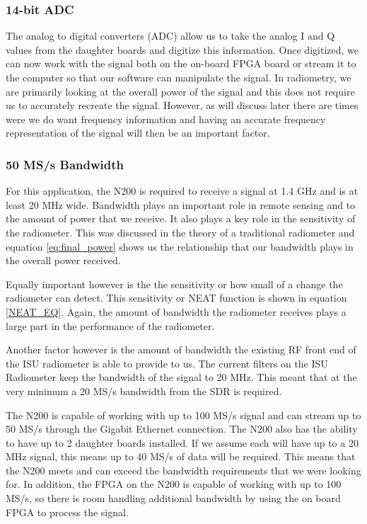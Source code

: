 \subsubsection{14-bit ADC}
The analog to digital converters (ADC) allow us to take the analog I and Q values from the daughter boards and digitize this information.  Once digitized, we can now work with the signal both on the on-board FPGA board or stream it to the computer so that our software can manipulate the signal.  In radiometry, we are primarily looking at the overall power of the signal and this does not require us to accurately recreate the signal.  However, as will discuss later there are times were we do want frequency information and having an accurate frequency representation of the signal will then be an important factor.

\subsubsection{50 MS/s Bandwidth}
For this application, the N200 is required to receive a signal at 1.4 GHz and is at least 20 MHz wide.  Bandwidth plays an important role in remote sensing and to the amount of power that we receive.  It also plays a key role in the sensitivity of the radiometer.  This was discussed in the theory of a traditional radiometer and equation \ref{eq:final_power} shows us the relationship that our bandwidth plays in the overall power received.    

Equally important however is the the sensitivity or how small of a change the radiometer can detect.  This sensitivity or NEAT function is shown in equation \ref{NEAT_EQ}.  Again, the amount of bandwidth the radiometer receives plays a large part in the performance of the radiometer.  

Another factor however is the amount of bandwidth the existing RF front end of the ISU radiometer is able to provide to us.  The current filters on the ISU Radiometer keep the bandwidth of the signal to 20 MHz.  This meant that at the very minimum a 20 MS/s bandwidth from the SDR is required.  

The N200 is capable of working with up to 100 MS/s signal and can stream up to 50 MS/s through the Gigabit Ethernet connection.  The N200 also has the ability to have up to 2 daughter boards installed.  If we assume each will have up to a 20 MHz signal, this means up to 40 MS/s of data will be required.  This means that the N200 meets and can exceed the bandwidth requirements that we were looking for.  In addition, the FPGA on the N200 is capable of working with up to 100 MS/s, so there is room handling additional bandwidth by using the on board FPGA to process the signal.

